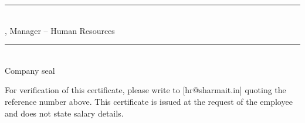 \documentclass[10pt]{article}
\begin{document}
\vspace{12pt}

\vspace{32pt}\noindent\parbox[t]{0.3\linewidth}{\centering\rule{\linewidth}{0.5pt}\\ [Anita Kulkarni], Manager -- Human Resources}\hfill\parbox[t]{0.3\linewidth}{\centering\rule{\linewidth}{0.5pt}\\ Company seal}\par

\noindent\colorbox{notebg}{\parbox{\dimexpr\linewidth-2\fboxsep}{\footnotesize For verification of this certificate, please write to [hr@sharmait.in] quoting the reference number above. This certificate is issued at the request of the employee and does not state salary details.}}\par\vspace{6pt}
\end{document}
